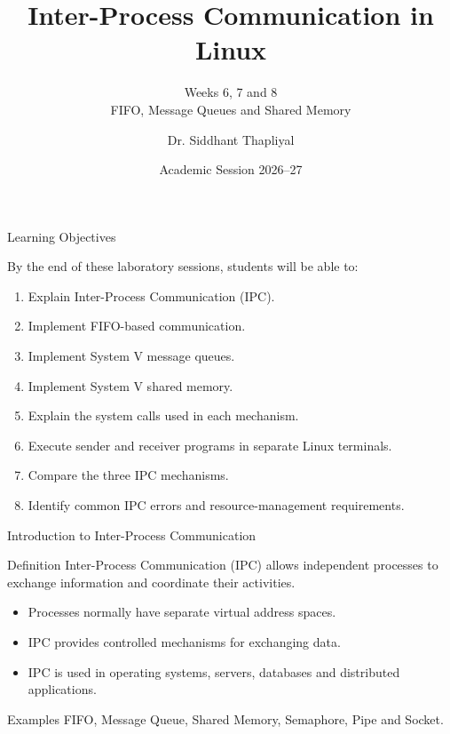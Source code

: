 \documentclass[aspectratio=169,10pt]{beamer}
\title[OS Lab: IPC]{Inter-Process Communication in Linux}
\subtitle{Weeks 6, 7 and 8\\
FIFO, Message Queues and Shared Memory}
\author{Dr. Siddhant Thapliyal}
\institute{
Department of Computer Science and Engineering\\
Graphic Era Deemed to be University
}
\date{Academic Session 2026--27}
\begin{document}
\begin{frame}
\titlepage
\end{frame}

\begin{frame}{Learning Objectives}

By the end of these laboratory sessions, students
will be able to:

\begin{enumerate}
    \item Explain Inter-Process Communication (IPC).
    \item Implement FIFO-based communication.
    \item Implement System V message queues.
    \item Implement System V shared memory.
    \item Explain the system calls used in each mechanism.
    \item Execute sender and receiver programs
    in separate Linux terminals.
    \item Compare the three IPC mechanisms.
    \item Identify common IPC errors and
    resource-management requirements.
\end{enumerate}

\end{frame}

\begin{frame}{Introduction to Inter-Process Communication}

\begin{block}{Definition}
Inter-Process Communication (IPC) allows
independent processes to exchange information
and coordinate their activities.
\end{block}

\begin{itemize}
    \item Processes normally have separate
    virtual address spaces.
    \item IPC provides controlled mechanisms
    for exchanging data.
    \item IPC is used in operating systems,
    servers, databases and distributed applications.
\end{itemize}

\begin{alertblock}{Examples}
FIFO, Message Queue, Shared Memory,
Semaphore, Pipe and Socket.
\end{alertblock}

\end{frame}
\end{document}
